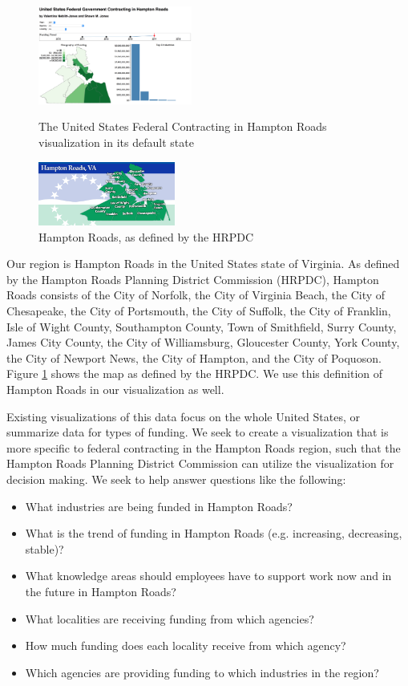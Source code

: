 \documentclass[10pt,journal,compsoc]{IEEEtran}
\begin{document}
\begin{figure}[t]

	\centering
	\includegraphics[width=0.45\textwidth]{images/teaser-screenie.png}
	\caption{The United States Federal Contracting in Hampton Roads visualization in its default state}
	\label{fig:default-main-vis}

	\vspace{3em}

	\centering
	\includegraphics[width=0.4\textwidth]{images/HRFlagMapslide.png}
	\caption{Hampton Roads, as defined by the HRPDC}
	\label{fig:hrpdc-flag}
\end{figure}

Our region is Hampton Roads in the United States state of Virginia.  As defined by the Hampton Roads Planning District Commission (HRPDC), Hampton Roads consists of the City of Norfolk, the City of Virginia Beach, the City of Chesapeake, the City of Portsmouth, the City of Suffolk, the City of Franklin, Isle of Wight County, Southampton County, Town of Smithfield, Surry County, James City County, the City of Williamsburg, Gloucester County, York County, the City of Newport News, the City of Hampton, and the City of Poquoson.  Figure \ref{fig:hrpdc-flag} shows the map as defined by the HRPDC.  We use this definition of Hampton Roads in our visualization as well.

Existing visualizations of this data focus on the whole United States, or summarize data for types of funding.  We seek to create a visualization that is more specific to federal contracting in the Hampton Roads region, such that the Hampton Roads Planning District Commission can utilize the visualization for decision making.  We seek to help answer questions like the following:
\begin{itemize}
\item What industries are being funded in Hampton Roads?
\item What is the trend of funding in Hampton Roads (e.g. increasing, decreasing, stable)?
\item What knowledge areas should employees have to support work now and in the future in Hampton Roads?
\item What localities are receiving funding from which agencies?
\item How much funding does each locality receive from which agency?
\item Which agencies are providing funding to which industries in the region?
\end{itemize}
\end{document}
